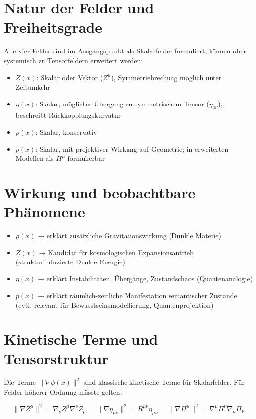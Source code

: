 \documentclass[11pt]{article}
\begin{document}
\section*{Natur der Felder und Freiheitsgrade}

Alle vier Felder sind im Ausgangspunkt als Skalarfelder formuliert,  
können aber systemisch zu Tensorfeldern erweitert werden:

\begin{itemize}
  \item $Z(x)$: Skalar oder Vektor ($Z^\mu$), Symmetriebrechung möglich unter Zeitumkehr
  \item $\eta(x)$: Skalar, möglicher Übergang zu symmetrischem Tensor ($\eta_{\mu\nu}$), beschreibt Rückkopplungskurvatur
  \item $\rho(x)$: Skalar, konservativ
  \item $p(x)$: Skalar, mit projektiver Wirkung auf Geometrie; in erweiterten Modellen als $\Pi^\mu$ formulierbar
\end{itemize}

\section*{Wirkung und beobachtbare Phänomene}

\begin{itemize}
  \item $\rho(x)$ → erklärt zusätzliche Gravitationswirkung (Dunkle Materie)
  \item $Z(x)$ → Kandidat für kosmologischen Expansionsantrieb (strukturinduzierte Dunkle Energie)
  \item $\eta(x)$ → erklärt Instabilitäten, Übergänge, Zustandschaos (Quantenanalogie)
  \item $p(x)$ → erklärt räumlich-zeitliche Manifestation semantischer Zustände (evtl. relevant für Bewusstseinsmodellierung, Quantenprojektion)
\end{itemize}

\section*{Kinetische Terme und Tensorstruktur}

Die Terme $\|\nabla \phi(x)\|^2$ sind klassische kinetische Terme für Skalarfelder.  
Für Felder höherer Ordnung müsste gelten:

\[
\|\nabla Z^\mu\|^2 = \nabla_\nu Z^\mu \nabla^\nu Z_\mu,\quad
\|\nabla \eta_{\mu\nu}\|^2 = R^{\mu\nu} \eta_{\mu\nu},\quad
\|\nabla \Pi^\mu\|^2 = \nabla^\mu \Pi^\nu \nabla_\mu \Pi_\nu
\]
\end{document}
